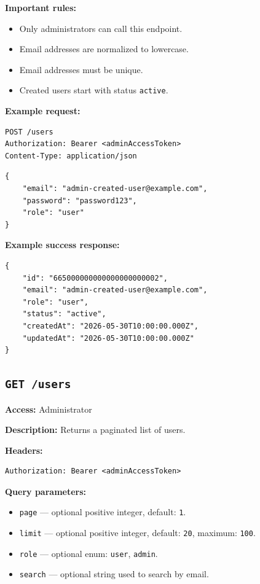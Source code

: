 \textbf{Important rules:}

\begin{itemize}
    \item Only administrators can call this endpoint.
    \item Email addresses are normalized to lowercase.
    \item Email addresses must be unique.
    \item Created users start with status \texttt{active}.
\end{itemize}

\textbf{Example request:}

\begin{verbatim}
POST /users
Authorization: Bearer <adminAccessToken>
Content-Type: application/json
\end{verbatim}

\begin{verbatim}
{
    "email": "admin-created-user@example.com",
    "password": "password123",
    "role": "user"
}
\end{verbatim}

\pagebreak
\textbf{Example success response:}

\begin{verbatim}
{
    "id": "665000000000000000000002",
    "email": "admin-created-user@example.com",
    "role": "user",
    "status": "active",
    "createdAt": "2026-05-30T10:00:00.000Z",
    "updatedAt": "2026-05-30T10:00:00.000Z"
}
\end{verbatim}

\subsection{\texttt{GET /users}}

\textbf{Access:} Administrator

\textbf{Description:} Returns a paginated list of users.

\textbf{Headers:}

\begin{verbatim}
Authorization: Bearer <adminAccessToken>
\end{verbatim}

\textbf{Query parameters:}

\begin{itemize}
    \item \texttt{page} --- optional positive integer, default: \texttt{1}.
    \item \texttt{limit} --- optional positive integer, default: \texttt{20}, maximum: \texttt{100}.
    \item \texttt{role} --- optional enum: \texttt{user}, \texttt{admin}.
    \item \texttt{search} --- optional string used to search by email.
\end{itemize}

